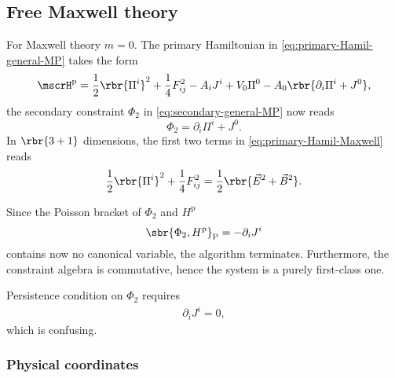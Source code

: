 \documentclass[a4paper,11pt]{article}
\begin{document}
\subsection{Free Maxwell theory}

For Maxwell theory $m = 0$. The primary Hamiltonian in 
\cref{eq:primary-Hamil-general-MP} takes the form
\begin{equation}
\mscrH^\text{p} = \frac{1}{2} \rbr{\Pi^i}^2 + \frac{1}{4} F_{ij}^2 - A_i J^i
+V_0 \Pi^0 - A_0 \rbr{\partial_i \Pi^i + J^0},
\label{eq:primary-Hamil-Maxwell}
\end{equation}
the secondary constraint $\Phi_2$ in \cref{eq:secondary-general-MP} now 
reads
\begin{equation}
\Phi_2 = \partial_i \Pi^i + J^0.
\end{equation}
In $\rbr{3+1}$ dimensions, the first two terms in 
\cref{eq:primary-Hamil-Maxwell} reads
\begin{equation}
\frac{1}{2}\rbr{\Pi^i}^2 + \frac{1}{4}F_{ij}^2 =
\frac{1}{2}\rbr{\vec E^2 + \vec B^2}.
\end{equation}


Since the Poisson bracket of $\Phi_2$ and $H^\text{p}$
\begin{equation}
\sbr{\Phi_2, H^\text{p}}_\text{P} = -\partial_i J^i
\end{equation}
contains now no canonical variable, the algorithm terminates. Furthermore, 
the constraint algebra is commutative, hence the system is a purely 
first-class one.

Persistence condition on $\Phi_2$ requires
\begin{align}
\partial_i J^i = 0,
\end{align}
which is confusing. 

\subsubsection{Physical coordinates}


\printbibliography
\end{document}
